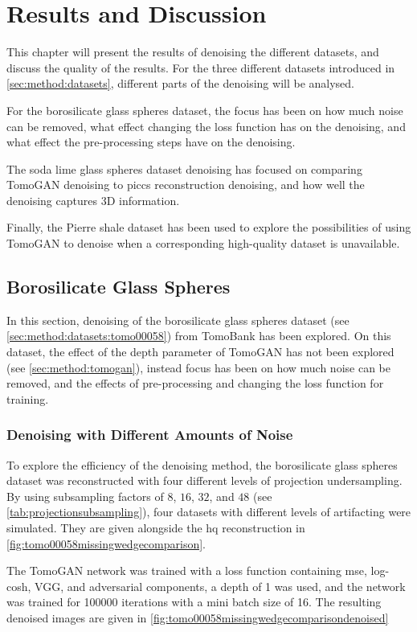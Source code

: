 \chapter{Results and Discussion}
\label{sec:results}
This chapter will present the results of denoising the different datasets, and discuss the quality of the results. For the three different datasets introduced in \cref{sec:method:datasets}, different parts of the denoising will be analysed. 

For the borosilicate glass spheres dataset, the focus has been on how much noise can be removed, what effect changing the loss function has on the denoising, and what effect the pre-processing steps have on the denoising. 

The soda lime glass spheres dataset denoising has focused on comparing TomoGAN denoising to \gls{piccs} reconstruction denoising, and how well the denoising captures 3D information. 

Finally, the Pierre shale dataset has been used to explore the possibilities of using TomoGAN to denoise when a corresponding high-quality dataset is unavailable. 

\section{Borosilicate Glass Spheres}
In this section, denoising of the borosilicate glass spheres dataset (see \cref{sec:method:datasets:tomo00058}) from TomoBank has been explored. On this dataset, the effect of the depth parameter of TomoGAN has not been explored (see \cref{sec:method:tomogan}), instead focus has been on how much noise can be removed, and the effects of pre-processing and changing the loss function for training.

\subsection{Denoising with Different Amounts of Noise}
To explore the efficiency of the denoising method, the borosilicate glass spheres dataset was reconstructed with four different levels of projection undersampling. By using subsampling factors of $8$, $16$, $32$, and $48$ (see \cref{tab:projectionsubsampling}), four datasets with different levels of artifacting were simulated. They are given alongside the \gls{hq} reconstruction in \cref{fig:tomo00058missingwedgecomparison}. 

The TomoGAN network was trained with a loss function containing \gls{mse}, log-cosh, VGG, and adversarial components, a depth of 1 was used, and the network was trained for 100000 iterations with a mini batch size of 16. The resulting denoised images are given in \cref{fig:tomo00058missingwedgecomparisondenoised}

